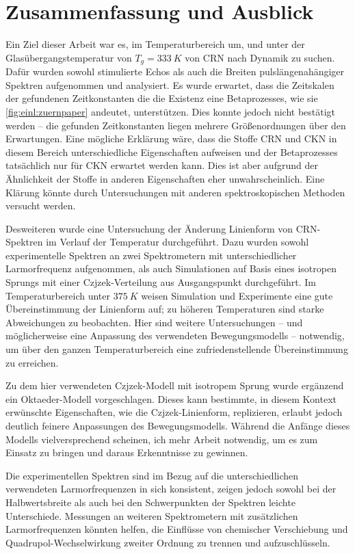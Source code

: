 \chapter{Zusammenfassung und Ausblick}

Ein Ziel dieser Arbeit war es, im Temperaturbereich um, und unter der Glasübergangstemperatur von $T_g = \SI{333}{K}$ von CRN nach Dynamik zu suchen. Dafür wurden sowohl stimulierte Echos als auch die Breiten pulslängenahängiger Spektren aufgenommen und analysiert. Es wurde erwartet, dass die Zeitskalen der gefundenen Zeitkonstanten die die Existenz eine Betaprozesses, wie sie \ref{fig:einl:zuernpaper} andeutet, unterstützen. Dies konnte jedoch nicht bestätigt werden -- die gefunden Zeitkonstanten liegen mehrere Größenordnungen über den Erwartungen. Eine mögliche Erklärung wäre, dass die Stoffe CRN und CKN in diesem Bereich unterschiedliche Eigenschaften aufweisen und der Betaprozesses tatsächlich nur für CKN erwartet werden kann. Dies ist aber aufgrund der Ähnlichkeit der Stoffe in anderen Eigenschaften eher unwahrscheinlich. Eine Klärung könnte durch Untersuchungen mit anderen spektroskopischen Methoden versucht werden.

Desweiteren wurde eine Untersuchung der Änderung Linienform von CRN-Spektren im Verlauf der Temperatur durchgeführt. Dazu wurden sowohl experimentelle Spektren an zwei Spektrometern mit unterschiedlicher Larmorfrequenz aufgenommen, als auch Simulationen auf Basis eines isotropen Sprungs mit einer Czjzek-Verteilung aus Ausgangspunkt durchgeführt. Im Temperaturbereich unter $\SI{375}{K}$ weisen Simulation und Experimente eine gute Übereinstimmung der Linienform auf; zu höheren Temperaturen sind starke Abweichungen zu beobachten. Hier sind weitere Untersuchungen -- und möglicherweise eine Anpassung des verwendeten Bewegungsmodells -- notwendig, um über den ganzen Temperaturbereich eine zufriedenstellende Übereinstimmung zu erreichen.

Zu dem hier verwendeten Czjzek-Modell mit isotropem Sprung wurde ergänzend ein Oktaeder-Modell vorgeschlagen. Dieses kann bestimmte, in diesem Kontext erwünschte Eigenschaften, wie die Czjzek-Linienform, replizieren, erlaubt jedoch deutlich feinere Anpassungen des Bewegungsmodells. Während die Anfänge dieses Modells vielversprechend scheinen, ich mehr Arbeit notwendig, um es zum Einsatz zu bringen und daraus Erkenntnisse zu gewinnen.

Die experimentellen Spektren sind im Bezug auf die unterschiedlichen verwendeten Larmorfrequenzen in sich konsistent, zeigen jedoch sowohl bei der Halbwertsbreite als auch bei den Schwerpunkten der Spektren leichte Unterschiede. Messungen an weiteren Spektrometern mit zusätzlichen Larmorfrequenzen könnten helfen, die Einflüsse von chemischer Verschiebung und Quadrupol-Wechselwirkung zweiter Ordnung zu trennen und aufzuschlüsseln. 

